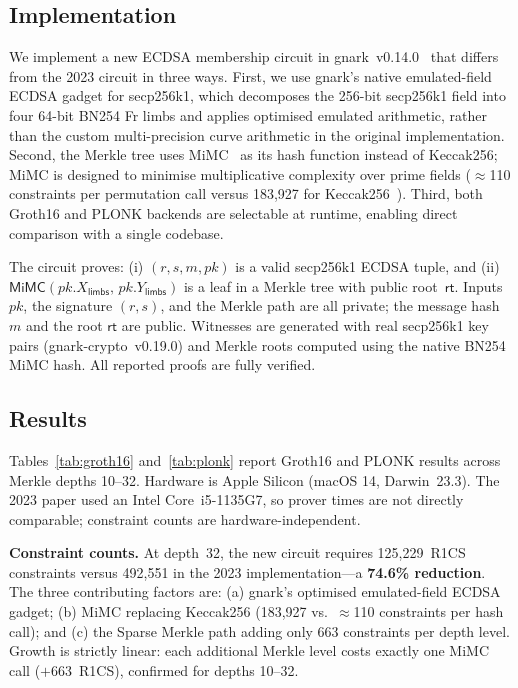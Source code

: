 \documentclass[conference]{IEEEtran}
\begin{document}
\subsection{Implementation}

We implement a new ECDSA membership circuit in gnark~v0.14.0~\cite{gnark}
that differs from the 2023 circuit in three ways.
First, we use gnark's native emulated-field ECDSA gadget for secp256k1,
which decomposes the 256-bit secp256k1 field into four 64-bit BN254 Fr
limbs and applies optimised emulated arithmetic, rather than the custom
multi-precision curve arithmetic in the original implementation.
Second, the Merkle tree uses MiMC~\cite{MiMC} as its hash function
instead of Keccak256; MiMC is designed to minimise multiplicative
complexity over prime fields ($\approx$110 constraints per permutation
call versus 183,927 for Keccak256~\cite{Kravchenko2023}).
Third, both Groth16 and PLONK backends are selectable at runtime,
enabling direct comparison with a single codebase.

The circuit proves: (i) $(r, s, m, pk)$ is a valid secp256k1 ECDSA
tuple, and (ii) $\mathsf{MiMC}(pk.X_\mathsf{limbs},\, pk.Y_\mathsf{limbs})$
is a leaf in a Merkle tree with public root~$\mathsf{rt}$.
Inputs $pk$, the signature $(r,s)$, and the Merkle path are all private;
the message hash $m$ and the root $\mathsf{rt}$ are public.
Witnesses are generated with real secp256k1 key pairs (gnark-crypto~v0.19.0)
and Merkle roots computed using the native BN254 MiMC hash.
All reported proofs are fully verified.

\subsection{Results}

Tables~\ref{tab:groth16} and~\ref{tab:plonk} report Groth16 and PLONK
results across Merkle depths 10--32.
Hardware is Apple Silicon (macOS 14, Darwin~23.3).
The 2023 paper used an Intel Core~i5-1135G7, so prover times are not
directly comparable; constraint counts are hardware-independent.

\textbf{Constraint counts.}
At depth~32, the new circuit requires 125,229~R1CS constraints
versus 492,551 in the 2023 implementation---a \textbf{74.6\% reduction}.
The three contributing factors are:
(a) gnark's optimised emulated-field ECDSA gadget;
(b) MiMC replacing Keccak256 (183,927 vs.\ $\approx$110 constraints
per hash call); and
(c) the Sparse Merkle path adding only 663 constraints per depth level.
Growth is strictly linear: each additional Merkle level costs exactly
one MiMC call ($+663$~R1CS), confirmed for depths 10--32.
\end{document}

